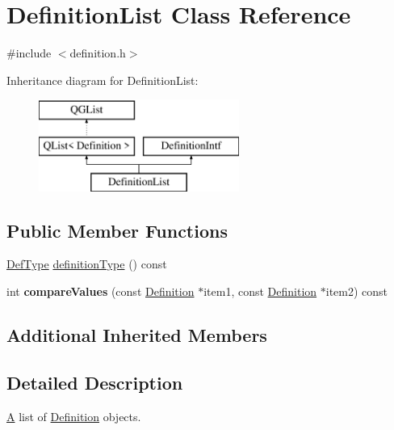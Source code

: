 \hypertarget{class_definition_list}{}\section{Definition\+List Class Reference}
\label{class_definition_list}


{\ttfamily \#include $<$definition.\+h$>$}

Inheritance diagram for Definition\+List\+:\begin{figure}[H]
\begin{center}
\leavevmode
\includegraphics[height=3.000000cm]{class_definition_list}
\end{center}
\end{figure}
\subsection*{Public Member Functions}
\begin{DoxyCompactItemize}
\item 
\mbox{\hyperlink{class_definition_intf_ada60114bc621669dd8c19edfc6421766}{Def\+Type}} \mbox{\hyperlink{class_definition_list_aef3047a40f8e9519e609019db6cb13b9}{definition\+Type}} () const
\item 
\mbox{\label{class_definition_list_a2b880144e9c6d2219268c106cf8777b7}} 
int {\bfseries compare\+Values} (const \mbox{\hyperlink{class_definition}{Definition}} $\ast$item1, const \mbox{\hyperlink{class_definition}{Definition}} $\ast$item2) const
\end{DoxyCompactItemize}
\subsection*{Additional Inherited Members}


\subsection{Detailed Description}
\mbox{\hyperlink{class_a}{A}} list of \mbox{\hyperlink{class_definition}{Definition}} objects. 

